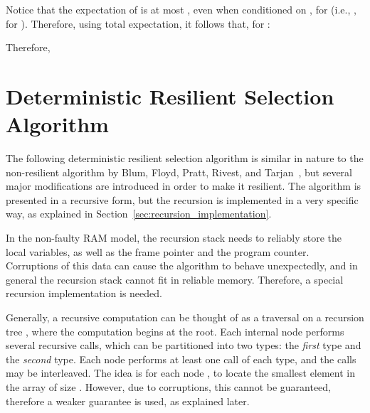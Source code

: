 \documentclass{llncs}
\begin{document}
\begin{pf}
Notice that the expectation of  is at most , even when conditioned on , for  (i.e., , for ). Therefore, using total expectation, it follows that, for :


Therefore,

\end{pf}





















\section{Deterministic Resilient Selection Algorithm}
\label{sec:resilient_deterministic_selection_algorithm}

The following deterministic resilient selection algorithm is similar in nature to the non-resilient algorithm by Blum, Floyd, Pratt, Rivest, and Tarjan~\cite{median_of_medians_algorithm}, but several major modifications are introduced in order to make it resilient. The algorithm is presented in a recursive form, but the recursion is implemented in a very specific way, as explained in Section~\ref{sec:recursion_implementation}.

In the non-faulty RAM model, the recursion stack needs to reliably store the local variables, as well as the frame pointer and the program counter. Corruptions of this data can cause the algorithm to behave unexpectedly, and in general the recursion stack cannot fit in reliable memory. Therefore, a special recursion implementation is needed. 

Generally, a recursive computation can be thought of as a traversal on a recursion tree , where the computation begins at the root. Each internal node  performs several recursive calls, which can be partitioned into two types: the \emph{first} type and the \emph{second} type. Each node performs at least one call of each type, and the calls may be interleaved. The idea is for each node , to locate the  smallest element in the array  of size . However, due to corruptions, this cannot be guaranteed, therefore a weaker guarantee is used, as explained later.
\end{document}
